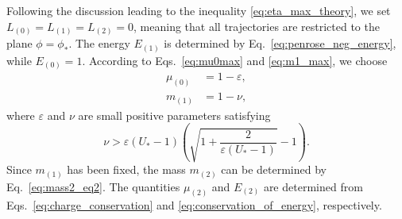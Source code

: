 Following the discussion leading to the inequality \eqref{eq:eta_max_theory}, we set $L_{(0)}=L_{(1)}=L_{(2)}=0$, meaning that all trajectories are restricted to the plane $\phi=\phi_*$. The energy $E_{(1)}$ is determined by Eq.~\eqref{eq:penrose_neg_energy}, while $E_{(0)}=1$. According to Eqs.~\eqref{eq:mu0max} and \eqref{eq:m1_max}, we choose
\begin{eqnarray}
    \label{eq:epsilondef} \mu_{(0)} &= 1 - \varepsilon, \\
    \label{eq:nudef} m_{(1)} &= 1 - \nu,
\end{eqnarray}
where $\varepsilon$ and $\nu$ are small positive parameters satisfying
\begin{equation} \label{eq:nuepsilonrelation}
    \nu > \varepsilon (U_* - 1) \left( \sqrt{1 + \frac{2}{\varepsilon (U_* - 1)}} - 1 \right).
\end{equation}
Since $m_{(1)}$  has been fixed, the mass $m_{(2)}$ can be determined by Eq.~\eqref{eq:mass2_eq2}. The quantities $\mu_{(2)}$ and $E_{(2)}$ are determined from Eqs.~\eqref{eq:charge_conservation} and \eqref{eq:conservation_of_energy}, respectively.


